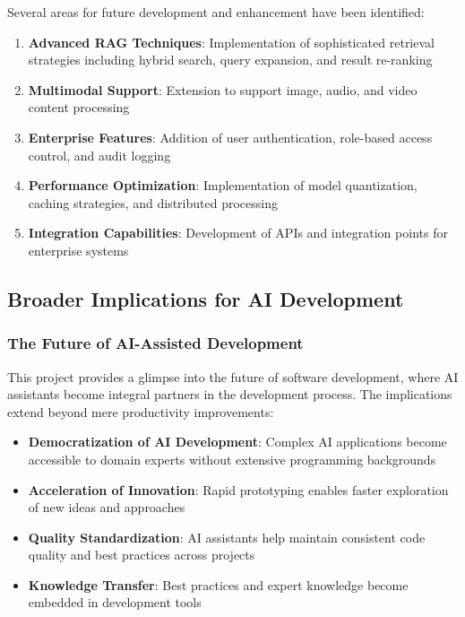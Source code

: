 Several areas for future development and enhancement have been identified:

\begin{enumerate}
    \item \textbf{Advanced RAG Techniques}: Implementation of sophisticated retrieval strategies including hybrid search, query expansion, and result re-ranking
    \item \textbf{Multimodal Support}: Extension to support image, audio, and video content processing
    \item \textbf{Enterprise Features}: Addition of user authentication, role-based access control, and audit logging
    \item \textbf{Performance Optimization}: Implementation of model quantization, caching strategies, and distributed processing
    \item \textbf{Integration Capabilities}: Development of APIs and integration points for enterprise systems
\end{enumerate}

\subsection{Broader Implications for AI Development}

\subsubsection{The Future of AI-Assisted Development}

This project provides a glimpse into the future of software development, where AI assistants become integral partners in the development process. The implications extend beyond mere productivity improvements:

\begin{itemize}
    \item \textbf{Democratization of AI Development}: Complex AI applications become accessible to domain experts without extensive programming backgrounds
    \item \textbf{Acceleration of Innovation}: Rapid prototyping enables faster exploration of new ideas and approaches
    \item \textbf{Quality Standardization}: AI assistants help maintain consistent code quality and best practices across projects
    \item \textbf{Knowledge Transfer}: Best practices and expert knowledge become embedded in development tools
\end{itemize}

